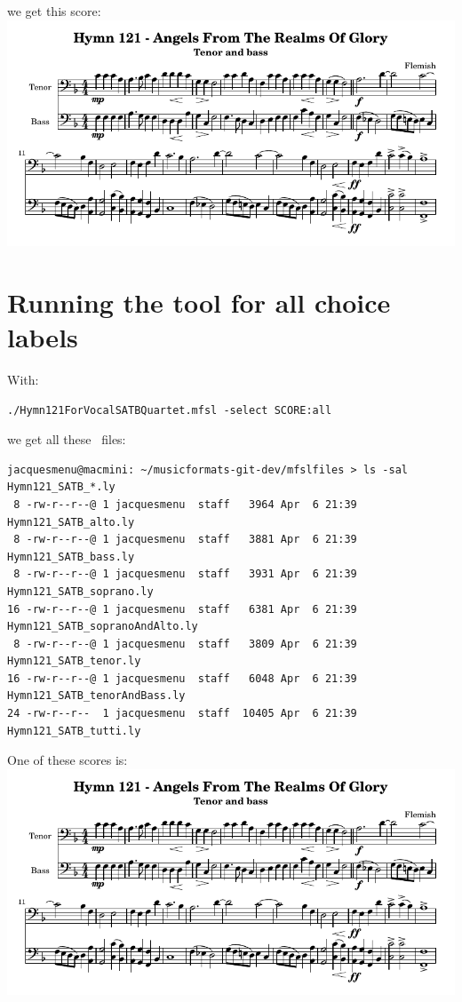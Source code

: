 we get this score:\\
\includegraphics[scale=0.8]{../graphics/Hymn121_SATB_tenorAndBass.png}


\section{Running the tool for all choice labels}

With:
\begin{lstlisting}[language=Terminal]
./Hymn121ForVocalSATBQuartet.mfsl -select SCORE:all
\end{lstlisting}

we get all these \lily\ files:
\begin{lstlisting}[language=TerminalSmall]
jacquesmenu@macmini: ~/musicformats-git-dev/mfslfiles > ls -sal Hymn121_SATB_*.ly
 8 -rw-r--r--@ 1 jacquesmenu  staff   3964 Apr  6 21:39 Hymn121_SATB_alto.ly
 8 -rw-r--r--@ 1 jacquesmenu  staff   3881 Apr  6 21:39 Hymn121_SATB_bass.ly
 8 -rw-r--r--@ 1 jacquesmenu  staff   3931 Apr  6 21:39 Hymn121_SATB_soprano.ly
16 -rw-r--r--@ 1 jacquesmenu  staff   6381 Apr  6 21:39 Hymn121_SATB_sopranoAndAlto.ly
 8 -rw-r--r--@ 1 jacquesmenu  staff   3809 Apr  6 21:39 Hymn121_SATB_tenor.ly
16 -rw-r--r--@ 1 jacquesmenu  staff   6048 Apr  6 21:39 Hymn121_SATB_tenorAndBass.ly
24 -rw-r--r--  1 jacquesmenu  staff  10405 Apr  6 21:39 Hymn121_SATB_tutti.ly
\end{lstlisting}

One of these scores is:\\
\includegraphics[scale=0.8]{../graphics/Hymn121_SATB_tenorAndBass.png}


